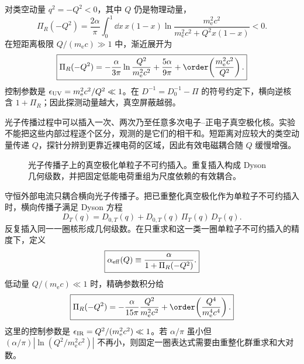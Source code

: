 对类空动量 \(q^2=-Q^2<0\)，其中 \(Q\) 仍是物理动量，
\begin{equation}
 \Pi_R(-Q^2)
 =\frac{2\alpha}{\pi}
 \int_0^1\dd x\,x(1-x)
 \ln\frac{m_{\mathrm e}^2c^2}{m_{\mathrm e}^2c^2+Q^2x(1-x)}<0.
 \label{eq:Pi-spacelike-r12}
\end{equation}
在短距离极限 \(Q/(m_{\mathrm e} c)\gg1\) 中，渐近展开为
\begin{equation}
 \boxed{
 \Pi_R(-Q^2)
 =-\frac{\alpha}{3\pi}
 \ln\frac{Q^2}{m_{\mathrm e}^2c^2}
 +\frac{5\alpha}{9\pi}
 +\order\!\left(\frac{m_{\mathrm e}^2c^2}{Q^2}\right).}
 \label{eq:Pi-spacelike-asymptotic-r12}
\end{equation}
控制参数是 \(\epsilon_{\rm UV}=m_{\mathrm e}^2c^2/Q^2\ll1\)。在 \(D^{-1}=D_0^{-1}-\Pi\) 的符号约定下，横向逆核含 \(1+\Pi_R\)；因此探测动量越大，真空屏蔽越弱。

光子传播过程中可以插入一次、两次乃至任意多次电子--正电子真空极化核。实验不能把这些内部过程逐个区分，观测的是它们的相干和。短距离对应较大的类空动量传递 \(Q\)，探针分辨到更靠近裸电荷的区域，因此有效电磁耦合随 \(Q\) 缓慢增强。


\begin{figure}[htbp]
 \centering
 
 \caption{光子传播子上的真空极化单粒子不可约插入。重复插入构成 Dyson 几何级数，并把固定低能电荷重组为尺度依赖的有效耦合。}
 \label{fig:qed-vacpol-dyson-dp7}
\end{figure}

守恒外部电流只耦合横向光子传播子。把已重整化真空极化作为单粒子不可约插入时，横向传播子满足 Dyson 方程
\begin{equation}
 \boxed{D_T(q)=D_{0,T}(q)+D_{0,T}(q)\,\Pi_T(q)\,D_T(q).}
 \label{eq:qed-dyson-transverse-r68}
\end{equation}
反复插入同一一圈核形成几何级数。在只重求和这一类一圈单粒子不可约插入的精度下，定义
\begin{equation}
 \boxed{
 \alpha_{\rm eff}(Q)
 \equiv
 \frac{\alpha}{1+\Pi_R(-Q^2)}.}
 \label{eq:qed-alpha-effective-dp7}
\end{equation}
低动量 \(Q/(m_{\mathrm e} c)\ll1\) 时，精确参数积分给
\begin{equation}
 \boxed{
 \Pi_R(-Q^2)
 =-\frac{\alpha}{15\pi}
 \frac{Q^2}{m_{\mathrm e}^2c^2}
 +\order\!\left(\frac{Q^4}{m_{\mathrm e}^4c^4}\right).}
 \label{eq:qed-pi-smallQ-dp7}
\end{equation}
这里的控制参数是 \(\epsilon_{\rm IR}=Q^2/(m_{\mathrm e}^2c^2)\ll1\)。若 \(\alpha/\pi\) 虽小但 \((\alpha/\pi)|\ln(Q^2/m_{\mathrm e}^2c^2)|\) 不再小，则固定一圈表达式需要由重整化群重求和大对数。

